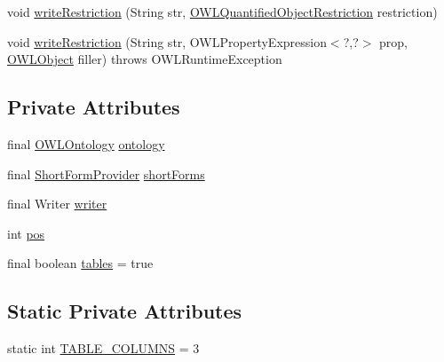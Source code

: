 \begin{DoxyCompactItemize}
\item 
void \hyperlink{classuk_1_1ac_1_1manchester_1_1owl_1_1owlapi_1_1tutorial_1_1io_1_1_o_w_l_tutorial_syntax_object_renderer_a4f8a0d7146bee09be771f2bdd1322b6a}{write\-Restriction} (String str, \hyperlink{interfaceorg_1_1semanticweb_1_1owlapi_1_1model_1_1_o_w_l_quantified_object_restriction}{O\-W\-L\-Quantified\-Object\-Restriction} restriction)
\item 
void \hyperlink{classuk_1_1ac_1_1manchester_1_1owl_1_1owlapi_1_1tutorial_1_1io_1_1_o_w_l_tutorial_syntax_object_renderer_a864bb697cd60033db14e38148ae0d66d}{write\-Restriction} (String str, O\-W\-L\-Property\-Expression$<$?,?$>$ prop, \hyperlink{interfaceorg_1_1semanticweb_1_1owlapi_1_1model_1_1_o_w_l_object}{O\-W\-L\-Object} filler)  throws O\-W\-L\-Runtime\-Exception 
\end{DoxyCompactItemize}
\subsection*{Private Attributes}
\begin{DoxyCompactItemize}
\item 
final \hyperlink{interfaceorg_1_1semanticweb_1_1owlapi_1_1model_1_1_o_w_l_ontology}{O\-W\-L\-Ontology} \hyperlink{classuk_1_1ac_1_1manchester_1_1owl_1_1owlapi_1_1tutorial_1_1io_1_1_o_w_l_tutorial_syntax_object_renderer_a11b35b33a51b17845ddec91d8e61958e}{ontology}
\item 
final \hyperlink{interfaceorg_1_1semanticweb_1_1owlapi_1_1util_1_1_short_form_provider}{Short\-Form\-Provider} \hyperlink{classuk_1_1ac_1_1manchester_1_1owl_1_1owlapi_1_1tutorial_1_1io_1_1_o_w_l_tutorial_syntax_object_renderer_afede727f233467cda3e3943797c6bea0}{short\-Forms}
\item 
final Writer \hyperlink{classuk_1_1ac_1_1manchester_1_1owl_1_1owlapi_1_1tutorial_1_1io_1_1_o_w_l_tutorial_syntax_object_renderer_ab482bfbe8cd84b9426edb5cdea576ef6}{writer}
\item 
int \hyperlink{classuk_1_1ac_1_1manchester_1_1owl_1_1owlapi_1_1tutorial_1_1io_1_1_o_w_l_tutorial_syntax_object_renderer_a38af54c2c03e05e5e7411b63c86a2762}{pos}
\item 
final boolean \hyperlink{classuk_1_1ac_1_1manchester_1_1owl_1_1owlapi_1_1tutorial_1_1io_1_1_o_w_l_tutorial_syntax_object_renderer_add9e1ee82d33606829cfa9a5e04b6dd6}{tables} = true
\end{DoxyCompactItemize}
\subsection*{Static Private Attributes}
\begin{DoxyCompactItemize}
\item 
static int \hyperlink{classuk_1_1ac_1_1manchester_1_1owl_1_1owlapi_1_1tutorial_1_1io_1_1_o_w_l_tutorial_syntax_object_renderer_ae82778993fae797269200c1069ae0cc9}{T\-A\-B\-L\-E\-\_\-\-C\-O\-L\-U\-M\-N\-S} = 3
\end{DoxyCompactItemize}


